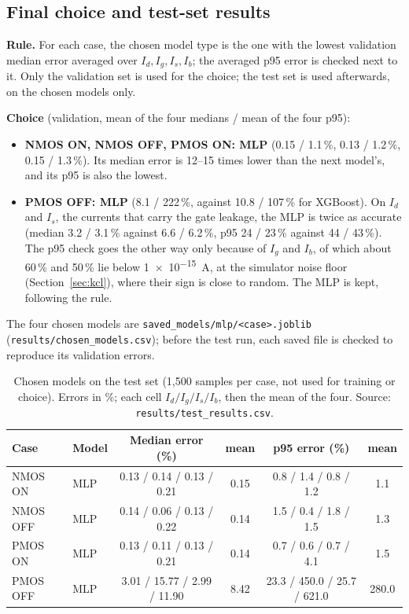 \documentclass[11pt,a4paper]{article}
\begin{document}
\subsection{Final choice and test-set results}\label{sec:choice}
\textbf{Rule.} For each case, the chosen model type is the one with the lowest validation median
error averaged over $I_d, I_g, I_s, I_b$; the averaged p95 error is checked next to it. Only the
validation set is used for the choice; the test set is used afterwards, on the chosen models only.

\textbf{Choice} (validation, mean of the four medians / mean of the four p95):
\begin{itemize}
  \item \textbf{NMOS ON, NMOS OFF, PMOS ON: MLP} (0.15 / 1.1\,\%, 0.13 / 1.2\,\%, 0.15 / 1.3\,\%). Its median
        error is 12--15 times lower than the next model's, and its p95 is also the lowest.
  \item \textbf{PMOS OFF: MLP} (8.1 / 222\,\%, against 10.8 / 107\,\% for XGBoost). On $I_d$ and $I_s$, the
        currents that carry the gate leakage, the MLP is twice as accurate (median 3.2 / 3.1\,\% against
        6.6 / 6.2\,\%, p95 24 / 23\,\% against 44 / 43\,\%). The p95 check goes the other way only because
        of $I_g$ and $I_b$, of which about 60\,\% and 50\,\% lie below \SI{1e-15}{A}, at the simulator
        noise floor (Section~\ref{sec:kcl}), where their sign is close to random. The MLP is kept,
        following the rule.
\end{itemize}
The four chosen models are \texttt{saved\_models/mlp/<case>.joblib} (\texttt{results/chosen\_models.csv});
before the test run, each saved file is checked to reproduce its validation errors.

\begin{table}[!htbp]
\centering
\footnotesize
\caption{Chosen models on the test set (1{,}500 samples per case, not used for training or choice).
Errors in \%; each cell $I_d / I_g / I_s / I_b$, then the mean of the four.
Source: \texttt{results/test\_results.csv}.}
\label{tab:test}
\setlength{\tabcolsep}{4pt}
\begin{tabular}{llcccc}
\toprule
Case & Model & Median error (\%) & mean & p95 error (\%) & mean \\
\midrule
NMOS ON  & MLP & 0.13 / 0.14 / 0.13 / 0.21 & 0.15 & 0.8 / 1.4 / 0.8 / 1.2 & 1.1 \\
NMOS OFF & MLP & 0.14 / 0.06 / 0.13 / 0.22 & 0.14 & 1.5 / 0.4 / 1.8 / 1.5 & 1.3 \\
PMOS ON  & MLP & 0.13 / 0.11 / 0.13 / 0.21 & 0.14 & 0.7 / 0.6 / 0.7 / 4.1 & 1.5 \\
PMOS OFF & MLP & 3.01 / 15.77 / 2.99 / 11.90 & 8.42 & 23.3 / 450.0 / 25.7 / 621.0 & 280.0 \\
\bottomrule
\end{tabular}
\end{table}
\end{document}
